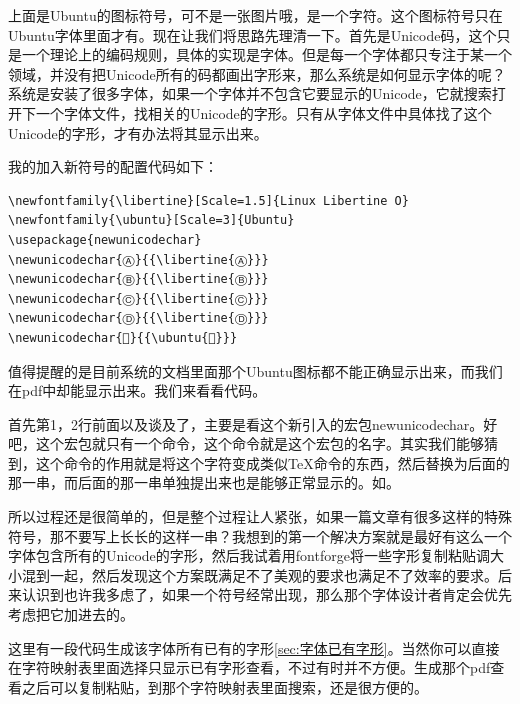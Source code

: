 \documentclass[11pt,oneside]{book}
\begin{document}
上面是Ubuntu的图标符号，可不是一张图片哦，是一个字符。这个图标符号只在Ubuntu字体里面才有。现在让我们将思路先理清一下。首先是Unicode码，这个只是一个理论上的编码规则，具体的实现是字体。但是每一个字体都只专注于某一个领域，并没有把Unicode所有的码都画出字形来，那么系统是如何显示字体的呢？系统是安装了很多字体，如果一个字体并不包含它要显示的Unicode，它就搜索打开下一个字体文件，找相关的Unicode的字形。只有从字体文件中具体找了这个Unicode的字形，才有办法将其显示出来。

我的加入新符号的配置代码如下：
\begin{Verbatim}
\newfontfamily{\libertine}[Scale=1.5]{Linux Libertine O}
\newfontfamily{\ubuntu}[Scale=3]{Ubuntu}
\usepackage{newunicodechar}
\newunicodechar{Ⓐ}{{\libertine{Ⓐ}}}
\newunicodechar{Ⓑ}{{\libertine{Ⓑ}}}
\newunicodechar{Ⓒ}{{\libertine{Ⓒ}}} 
\newunicodechar{Ⓓ}{{\libertine{Ⓓ}}}
\newunicodechar{}{{\ubuntu{}}}
\end{Verbatim}

值得提醒的是目前系统的文档里面那个Ubuntu图标都不能正确显示出来，而我们在pdf中却能显示出来。我们来看看代码。

首先第1，2行前面以及谈及了，主要是看这个新引入的宏包newunicodechar。好吧，这个宏包就只有一个命令，这个命令就是这个宏包的名字。其实我们能够猜到，这个命令的作用就是将这个字符变成类似\TeX 命令的东西，然后替换为后面的那一串，而后面的那一串单独提出来也是能够正常显示的。如{}。

\begin{flushright}
\begin{notecard}[olive!30]{20em}
所以过程还是很简单的，但是整个过程让人紧张，如果一篇文章有很多这样的特殊符号，那不要写上长长的这样一串？我想到的第一个解决方案就是最好有这么一个字体包含所有的Unicode的字形，然后我试着用fontforge将一些字形复制粘贴调大小混到一起，然后发现这个方案既满足不了美观的要求也满足不了效率的要求。后来认识到也许我多虑了，如果一个符号经常出现，那么那个字体设计者肯定会优先考虑把它加进去的。
\end{notecard}
\end{flushright}


这里有一段代码生成该字体所有已有的字形\ref{sec:字体已有字形}。当然你可以直接在字符映射表里面选择只显示已有字形查看，不过有时并不方便。生成那个pdf查看之后可以复制粘贴，到那个字符映射表里面搜索，还是很方便的。
\end{document}
